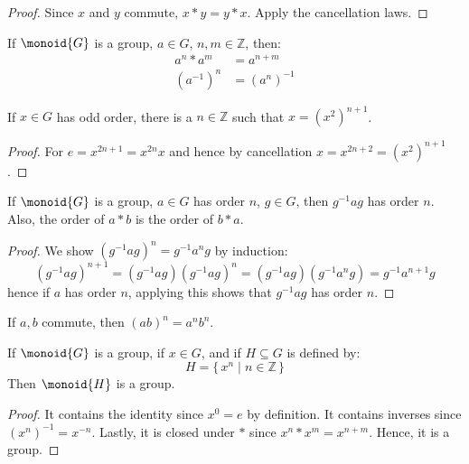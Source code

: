     \begin{proof}
        Since $x$ and $y$ commute, $x*y=y*x$. Apply the cancellation laws.
    \end{proof}
    \begin{theorem}
        If $\monoid{G}$ is a group, $a\in{G}$, $n,m\in\mathbb{Z}$, then:
        \begin{align}
            a^{n}*a^{m}&=a^{n+m}\\
            (a^{\minus{1}})^{n}&=(a^{n})^{\minus{1}}
        \end{align}
    \end{theorem}
    \begin{theorem}
        If $x\in{G}$ has odd order, there is a $n\in\mathbb{Z}$ such that
        $x=(x^{2})^{n+1}$.
    \end{theorem}
    \begin{proof}
        For $e=x^{2n+1}=x^{2n}x$ and hence by cancellation
        $x=x^{2n+2}=(x^{2})^{n+1}$.
    \end{proof}
    \begin{theorem}
        If $\monoid{G}$ is a group, $a\in{G}$ has order $n$, $g\in{G}$,
        then $g^{\minus{1}}ag$ has order $n$. Also, the order of $a*b$ is
        the order of $b*a$.
    \end{theorem}
    \begin{proof}
        We show $(g^{\minus{1}}ag)^{n}=g^{\minus{1}}a^{n}g$ by induction:
        \begin{equation}
            (g^{\minus{1}}ag)^{n+1}=(g^{\minus{1}}ag)(g^{\minus{1}}ag)^{n}
            =(g^{\minus{1}}ag)(g^{\minus{1}}a^{n}g)
            =g^{\minus{1}}a^{n+1}g
        \end{equation}
        hence if $a$ has order $n$, applying this shows that
        $g^{\minus{1}}ag$ has order $n$.
    \end{proof}
    \begin{theorem}
        If $a,b$ commute, then $(ab)^{n}=a^{n}b^{n}$.
    \end{theorem}
    \begin{theorem}
        If $\monoid{G}$ is a group, if $x\in{G}$, and if $H\subseteq{G}$ is
        defined by:
        \begin{equation}
            H=\{\,x^{n}\;|\;n\in\mathbb{Z}\,\}
        \end{equation}
        Then $\monoid{H}$ is a group.
    \end{theorem}
    \begin{proof}
        It contains the identity since $x^{0}=e$ by definition. It contains
        inverses since $(x^{n})^{\minus{1}}=x^{\minus{n}}$. Lastly, it
        is closed under $*$ since $x^{n}*x^{m}=x^{n+m}$. Hence, it is a
        group.
    \end{proof}
